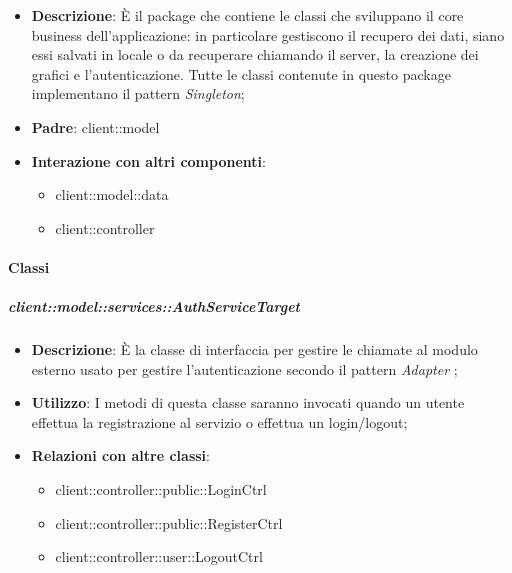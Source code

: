 \begin{itemize}
	\item \textbf{Descrizione}: È il package che contiene le classi che sviluppano il core business dell'applicazione: in particolare gestiscono il recupero dei dati, siano essi salvati in locale o da recuperare chiamando il server, la creazione dei grafici e l'autenticazione.
	Tutte le classi contenute in questo package implementano il pattern \emph{Singleton};
	\item \textbf{Padre}: client::model
	\item \textbf{Interazione con altri componenti}:
		\begin{itemize}
			\item client::model::data
			\item client::controller
		\end{itemize}
\end{itemize}

	\paragraph{Classi} %

		\subparagraph{client::model::services::AuthServiceTarget} %
		\label{subp:client_model_services_authservice}
			\begin{itemize}
				\item \textbf{Descrizione}: È la classe di interfaccia per gestire le chiamate al modulo esterno usato per gestire l'autenticazione secondo il pattern \emph{Adapter} ;
				\item \textbf{Utilizzo}: I metodi di questa classe saranno invocati quando un utente effettua la registrazione al servizio o effettua un login/logout;
				\item \textbf{Relazioni con altre classi}:
					\begin{itemize}
						\item client::controller::public::LoginCtrl
						\item client::controller::public::RegisterCtrl
						\item client::controller::user::LogoutCtrl
					\end{itemize}
			\end{itemize}

